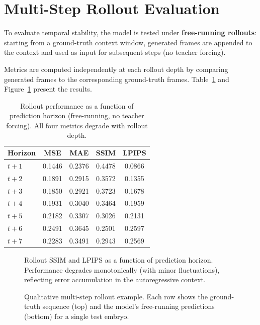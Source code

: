 \documentclass[12pt, a4paper, twoside]{report}
\begin{document}
\section{Multi-Step Rollout Evaluation}
\label{sec:rollout}

To evaluate temporal stability, the model is tested under \textbf{free-running
rollouts}: starting from a ground-truth context window, generated frames are
appended to the context and used as input for subsequent steps (no teacher
forcing).

Metrics are computed independently at each rollout depth by comparing
generated frames to the corresponding ground-truth frames.
Table~\ref{tab:rollout} and Figure~\ref{fig:rollout_metrics} present the
results.

\begin{table}[H]
\centering
\caption{Rollout performance as a function of prediction horizon (free-running,
         no teacher forcing). All four metrics degrade with rollout depth.}
\label{tab:rollout}
\begin{tabular}{lcccc}
\toprule
\textbf{Horizon} & \textbf{MSE} & \textbf{MAE} & \textbf{SSIM} & \textbf{LPIPS} \\
\midrule
$t{+}1$ & 0.1446 & 0.2376 & 0.4478 & 0.0866 \\
$t{+}2$ & 0.1891 & 0.2915 & 0.3572 & 0.1355 \\
$t{+}3$ & 0.1850 & 0.2921 & 0.3723 & 0.1678 \\
$t{+}4$ & 0.1931 & 0.3040 & 0.3464 & 0.1959 \\
$t{+}5$ & 0.2182 & 0.3307 & 0.3026 & 0.2131 \\
$t{+}6$ & 0.2491 & 0.3645 & 0.2501 & 0.2597 \\
$t{+}7$ & 0.2283 & 0.3491 & 0.2943 & 0.2569 \\
\bottomrule
\end{tabular}
\end{table}

\begin{figure}[H]
\centering
\caption{Rollout SSIM and LPIPS as a function of prediction horizon.
         Performance degrades monotonically (with minor fluctuations),
         reflecting error accumulation in the autoregressive context.}
\label{fig:rollout_metrics}
\end{figure}

\begin{figure}[H]
\centering
\caption{Qualitative multi-step rollout example. Each row shows the
         ground-truth sequence (top) and the model's free-running predictions
         (bottom) for a single test embryo.}
\label{fig:rollout_qual}
\end{figure}
\end{document}
